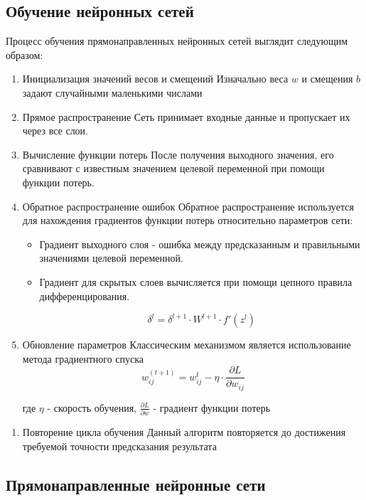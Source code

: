{\subsection{Обучение нейронных сетей}

Процесс обучения прямонаправленных нейронных сетей выглядит следующим образом:
\begin{enumerate}
\item Инициализация значений весов и смещений
Изначально веса \(w\) и смещения \(b\) задают случайными маленькими числами
\item Прямое распространение
Сеть принимает входные данные и пропускает их через все слои.
\item Вычисление функции потерь
После получения выходного значения, его сравнивают с известным значением целевой переменной при
помощи функции потерь.
\item Обратное распространение ошибок
Обратное распространение используется для нахождения градиентов функции потерь относительно
параметров сети:
\begin{itemize}
\item Градиент выходного слоя - ошибка между предсказанным и правильными значениями целевой
переменной.
\item Градиент для скрытых слоев вычисляется при помощи цепного правила дифференцирования.

\begin{equation}
\delta^{l} = \delta^{l + 1} \cdot W^{l + 1} \cdot f'(z^{l})
\end{equation}
\end{itemize}

\item Обновление параметров
Классическим механизмом является использование метода градиентного спуска
\begin{equation}
w_{ij}^{(t+1)} = w_{ij}^{t} - \eta \cdot \frac{\partial L}{\partial w_{ij}}
\end{equation}

где \(\eta\) - скорость обучения, \(\frac{\partial L}{\partial w}\) - градиент функции потерь
\end{enumerate}


\begin{enumerate}
\item Повторение цикла обучения
Данный алгоритм повторяется до достижения требуемой точности предсказания результата
\end{enumerate}
\subsection{Прямонаправленные нейронные сети}

}
